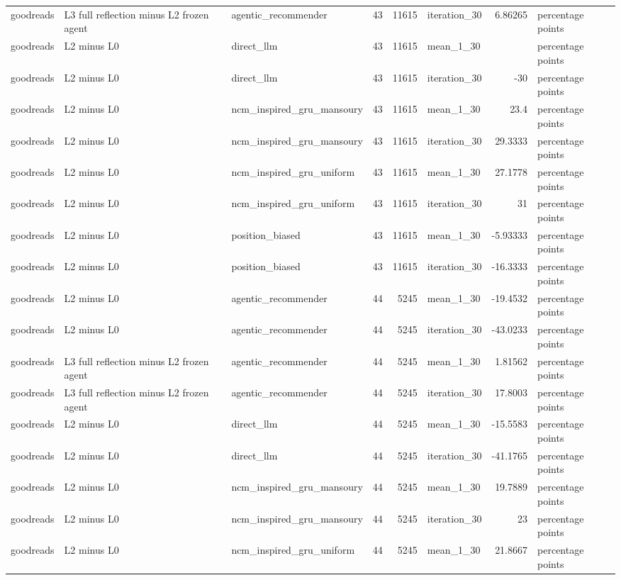 \begin{table}[htbp!]
\begin{tabular}{lllrrlrl}
goodreads & L3 full reflection minus L2 frozen agent & agentic\_recommender & 43 & 11615 & iteration\_30 & 6.86265 & percentage points \\
goodreads & L2 minus L0 & direct\_llm & 43 & 11615 & mean\_1\_30 & \textemdash{} & percentage points \\
goodreads & L2 minus L0 & direct\_llm & 43 & 11615 & iteration\_30 & -30 & percentage points \\
goodreads & L2 minus L0 & ncm\_inspired\_gru\_mansoury & 43 & 11615 & mean\_1\_30 & 23.4 & percentage points \\
goodreads & L2 minus L0 & ncm\_inspired\_gru\_mansoury & 43 & 11615 & iteration\_30 & 29.3333 & percentage points \\
goodreads & L2 minus L0 & ncm\_inspired\_gru\_uniform & 43 & 11615 & mean\_1\_30 & 27.1778 & percentage points \\
goodreads & L2 minus L0 & ncm\_inspired\_gru\_uniform & 43 & 11615 & iteration\_30 & 31 & percentage points \\
goodreads & L2 minus L0 & position\_biased & 43 & 11615 & mean\_1\_30 & -5.93333 & percentage points \\
goodreads & L2 minus L0 & position\_biased & 43 & 11615 & iteration\_30 & -16.3333 & percentage points \\
goodreads & L2 minus L0 & agentic\_recommender & 44 & 5245 & mean\_1\_30 & -19.4532 & percentage points \\
goodreads & L2 minus L0 & agentic\_recommender & 44 & 5245 & iteration\_30 & -43.0233 & percentage points \\
goodreads & L3 full reflection minus L2 frozen agent & agentic\_recommender & 44 & 5245 & mean\_1\_30 & 1.81562 & percentage points \\
goodreads & L3 full reflection minus L2 frozen agent & agentic\_recommender & 44 & 5245 & iteration\_30 & 17.8003 & percentage points \\
goodreads & L2 minus L0 & direct\_llm & 44 & 5245 & mean\_1\_30 & -15.5583 & percentage points \\
goodreads & L2 minus L0 & direct\_llm & 44 & 5245 & iteration\_30 & -41.1765 & percentage points \\
goodreads & L2 minus L0 & ncm\_inspired\_gru\_mansoury & 44 & 5245 & mean\_1\_30 & 19.7889 & percentage points \\
goodreads & L2 minus L0 & ncm\_inspired\_gru\_mansoury & 44 & 5245 & iteration\_30 & 23 & percentage points \\
goodreads & L2 minus L0 & ncm\_inspired\_gru\_uniform & 44 & 5245 & mean\_1\_30 & 21.8667 & percentage points \\

\end{tabular}
\end{table}

